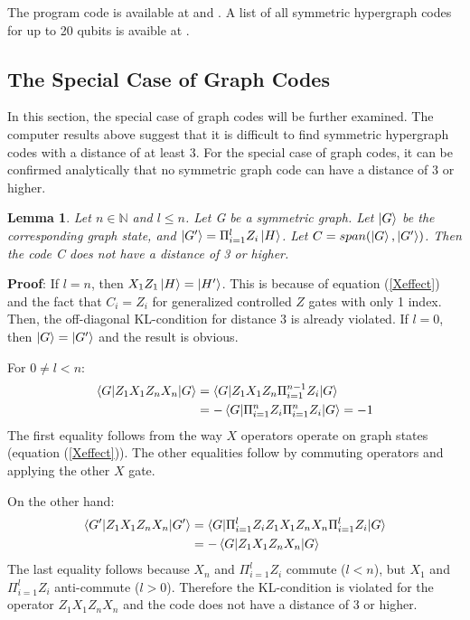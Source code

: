 \documentclass[12pt]{iopart}
\newtheorem{lemma}{Lemma}
\begin{document}
The program code is available at \cite{Program1} and
\cite{Program2}. A list of all symmetric hypergraph codes for up to 20 qubits is avaible at \cite{Program2}.

\subsection{The Special Case of Graph Codes}
\label{GraphCodesSection}
In this section, the special case of graph codes will be further examined. The computer results above suggest that it is difficult to find symmetric hypergraph codes with a distance of at least 3. For the special case of graph codes, it can be confirmed analytically that no symmetric graph code can have a distance of 3 or higher.

\begin{lemma}
Let $n \in \mathbb{N}$ and $l \leq n$. Let G be a symmetric graph. Let $\ket{G}$ be the corresponding graph state, and $\ket{G^\prime} = \Pi_{i=1}^lZ_i\ket{H}$. Let $C = span(\ket{G},\ket{G^\prime})$. Then the code C does not have a distance of 3 or higher.
\end{lemma}

\textbf{Proof}:
If $l = n$, then $X_1Z_1 \ket{H} = \ket{H^\prime}$. This is because of equation (\ref{Xeffect}) and the fact that $C_i = Z_i$ for generalized controlled $Z$ gates with only 1 index.
Then, the off-diagonal KL-condition for distance 3 is already violated.
If $l = 0$, then $\ket{G} = \ket{G^\prime}$ and the result is obvious.

For $0 \neq l < n$:
\begin{eqnarray}
\braket{G|Z_1X_1Z_nX_n|G} &= \braket{G|Z_1X_1Z_n   \Pi_{i=1}^{n-1}Z_i|G} \nonumber \\ &= - \braket{G|\Pi_{i=1}^nZ_i\Pi_{i=1}^nZ_i|G} = -1
\end{eqnarray}
The first equality follows from the way $X$ operators operate on graph states (equation (\ref{Xeffect})). The other equalities follow by commuting operators and applying the other $X$ gate.

On the other hand:
\begin{eqnarray}
\braket{G^\prime|Z_1X_1Z_nX_n|G^\prime} &= \braket{G|\Pi_{i=1}^lZ_i Z_1X_1Z_nX_n \Pi_{i=1}^lZ_i|G} \nonumber \\ &= - \braket{G|Z_1X_1Z_nX_n|G}
\end{eqnarray}
The last equality follows because $X_n$ and $\Pi_{i=1}^lZ_i$ commute ($l < n$), but $X_1$ and $\Pi_{i=1}^lZ_i$ anti-commute ($l > 0$).
Therefore the KL-condition is violated for the operator $Z_1X_1Z_nX_n$ and the code does not have a distance of 3 or higher.
\end{document}
